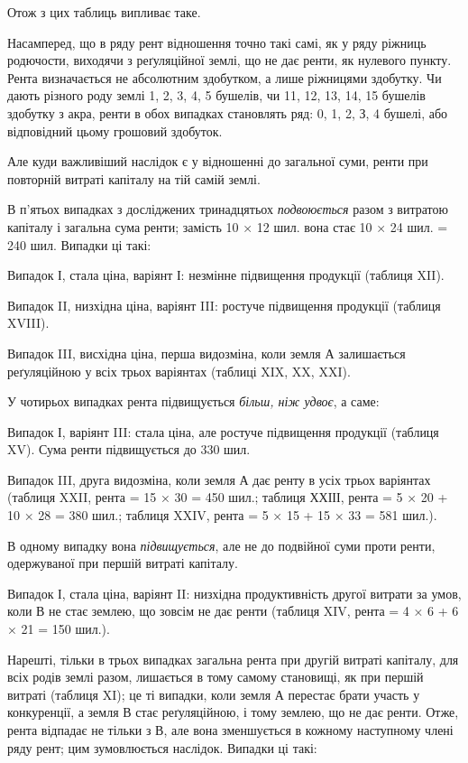 

Отож з цих таблиць випливає таке.

Насамперед, що в ряду рент відношення точно такі самі, як у ряду ріжниць
родючости, виходячи з реґуляційної землі, що не дає ренти, як нулевого
пункту. Рента визначається не абсолютним здобутком, а лише ріжницями здобутку.
Чи дають різного роду землі 1, 2, 3, 4, 5 бушелів, чи 11, 12, 13, 14,
15 бушелів здобутку з акра, ренти в обох випадках становлять ряд: 0, 1, 2,
З, 4 бушелі, або відповідний цьому грошовий здобуток.

Але куди важливіший наслідок є у відношенні до загальної суми, ренти
при повторній витраті капіталу на тій самій землі.

В п’ятьох випадках з досліджених тринадцятьох \emph{подвоюється} разом з витратою
капіталу і загальна сума ренти; замість 10 × 12 шил. вона стає
10 × 24 шил. = 240 шил. Випадки ці такі:

Випадок І, стала ціна, варіянт І: незмінне підвищення продукції (таблиця
XII).

Випадок II, низхідна ціна, варіянт III: ростуче підвищення продукції
(таблиця XVIII).

Випадок III, висхідна ціна, перша видозміна, коли земля А залишається
реґуляційною у всіх трьох варіянтах (таблиці XIX, XX, XXI).

У чотирьох випадках рента підвищується \emph{більш, ніж удвоє}, а саме:

Випадок І, варіянт III: стала ціна, але ростуче підвищення продукції
(таблиця XV). Сума ренти підвищується до 330 шил.

Випадок III, друга видозміна, коли земля А дає ренту в усіх трьох варіянтах
(таблиця XXII, рента = 15 × 30 = 450 шил.; таблиця ХХІІІ, рента = 5 ×
20 + 10 × 28 = 380 шил.; таблиця XXIV, рента = 5 × 15 + 15 × 33  =
581  шил.).

В одному випадку вона \emph{підвищується}, але не до подвійної суми проти
ренти, одержуваної при першій витраті капіталу.

Випадок І, стала ціна, варіянт II: низхідна продуктивність другої витрати
за умов, коли В не стає землею, що зовсім не дає ренти (таблиця XIV, рента
= 4 × 6 + 6 × 21 = 150 шил.).

Нарешті, тільки в трьох випадках загальна рента при другій витраті
капіталу, для всіх родів землі разом, лишається в тому самому становищі, як при
першій витраті (таблиця XI); це ті випадки, коли земля А перестає брати участь
у конкуренції, а земля В стає реґуляційною, і тому землею, що не дає ренти.
Отже, рента відпадає не тільки з В, але вона зменшується в кожному наступному
члені ряду рент; цим зумовлюється наслідок. Випадки ці такі:

